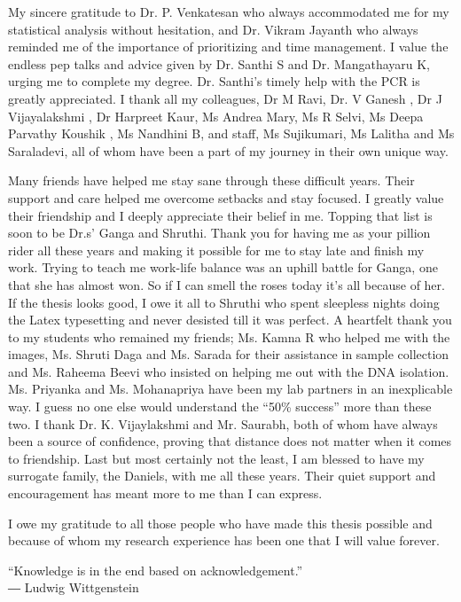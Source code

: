 My sincere gratitude to Dr. P. Venkatesan who always accommodated me for my statistical analysis without hesitation, and Dr. Vikram Jayanth who always reminded me of the importance of prioritizing and time management. I value the endless pep talks and advice given by Dr. Santhi S and Dr. Mangathayaru K, urging me to complete my degree. Dr. Santhi’s timely help with the PCR is greatly appreciated. I thank all my colleagues, Dr M Ravi, Dr. V Ganesh , Dr J Vijayalakshmi , Dr Harpreet Kaur, Ms Andrea Mary, Ms R Selvi, Ms Deepa Parvathy Koushik , Ms Nandhini B, and staff, Ms Sujikumari, Ms Lalitha and Ms Saraladevi, all of whom have been a part of my journey in their own unique way.

Many friends have helped me stay sane through these difficult years. Their support and care helped me overcome setbacks and stay focused. I greatly value their friendship and I deeply appreciate their belief in me. Topping that list is soon to be Dr.s’ Ganga and Shruthi. Thank you for having me as your pillion rider all these years and making it possible for me to stay late and finish my work. Trying to teach me work-life balance was an uphill battle for Ganga, one that she has almost won. So if I can smell the roses today it’s all because of her. If the thesis looks good, I owe it all to Shruthi who spent sleepless nights doing the Latex typesetting and never desisted till it was perfect. A heartfelt thank you to my students who remained my friends; Ms. Kamna R who helped me with the images, Ms. Shruti Daga and Ms. Sarada for their assistance in sample collection and Ms. Raheema Beevi who insisted on helping me out with the DNA isolation. Ms. Priyanka and Ms. Mohanapriya have been my lab partners in an inexplicable way. I guess no one else would understand the ``50\% success'' more than these two. I thank Dr. K. Vijaylakshmi and Mr. Saurabh, both of whom have always been a source of confidence, proving that distance does not matter when it comes to friendship. Last but most certainly not the least, I am blessed to have my surrogate family, the Daniels, with me all these years. Their quiet support and encouragement has meant more to me than I can express. 

I owe my gratitude to all those people who have made this thesis possible and because of whom my research experience has been one that I will value forever.


\vspace{4em}
\begin{center}
\begin{minipage}{0.6\textwidth}

 ``Knowledge is in the end based on acknowledgement.'' \\
― Ludwig Wittgenstein

\end{minipage} 
\end{center} 
